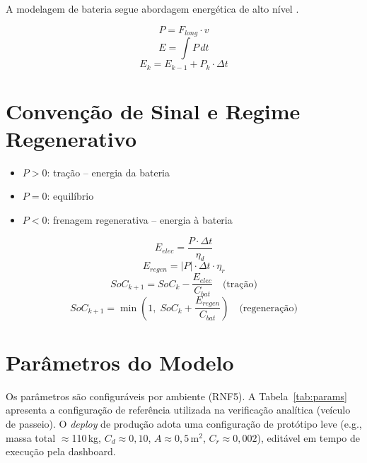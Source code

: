 \documentclass[12pt,a4paper]{report}
\begin{document}
A modelagem de bateria segue abordagem energética de alto nível \cite{larminie2012electric}.

\begin{equation} P = F_{long} \cdot v \end{equation}
\begin{equation} E = \int P \, dt \end{equation}
\begin{equation} E_k = E_{k-1} + P_k \cdot \Delta t \end{equation}

\section{Convenção de Sinal e Regime Regenerativo}

\begin{itemize}
    \item $P > 0$: tração -- energia da bateria
    \item $P = 0$: equilíbrio
    \item $P < 0$: frenagem regenerativa -- energia à bateria
\end{itemize}

\begin{equation} E_{elec} = \frac{P \cdot \Delta t}{\eta_d} \end{equation}
\begin{equation} E_{regen} = |P| \cdot \Delta t \cdot \eta_r \end{equation}
\begin{equation} SoC_{k+1} = SoC_k - \frac{E_{elec}}{C_{bat}} \quad \text{(tração)} \end{equation}
\begin{equation} SoC_{k+1} = \min\left(1,\; SoC_k + \frac{E_{regen}}{C_{bat}}\right) \quad \text{(regeneração)} \end{equation}

\section{Parâmetros do Modelo}

Os parâmetros são configuráveis por ambiente (RNF5). A Tabela~\ref{tab:params} apresenta a configuração de referência utilizada na verificação analítica (veículo de passeio). O \textit{deploy} de produção adota uma configuração de protótipo leve (e.g., massa total $\approx$110\,kg, $C_d \approx 0{,}10$, $A \approx 0{,}5$\,m$^2$, $C_r \approx 0{,}002$), editável em tempo de execução pela dashboard.
\end{document}
